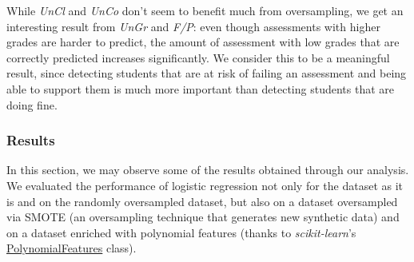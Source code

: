 \documentclass{article}
\begin{document}
While \textit{UnCl} and \textit{UnCo} don't seem to benefit much from oversampling, we get an interesting result from \textit{UnGr} and \textit{F/P}: even though assessments with higher grades are harder to predict, the amount of assessment with low grades that are correctly predicted increases significantly. We consider this to be a meaningful result, since detecting students that are at risk of failing an assessment and being able to support them is much more important than detecting students that are doing fine.

\subsubsection{Results}

In this section, we may observe some of the results obtained through our analysis. We evaluated the performance of logistic regression not only for the dataset as it is and on the randomly oversampled dataset, but also on a dataset oversampled via SMOTE (an oversampling technique that generates new synthetic data) and on a dataset enriched with polynomial features (thanks to \textit{scikit-learn}'s {\href{https://scikit-learn.org/stable/modules/generated/sklearn.preprocessing.PolynomialFeatures.html}{PolynomialFeatures}} class).
\end{document}
